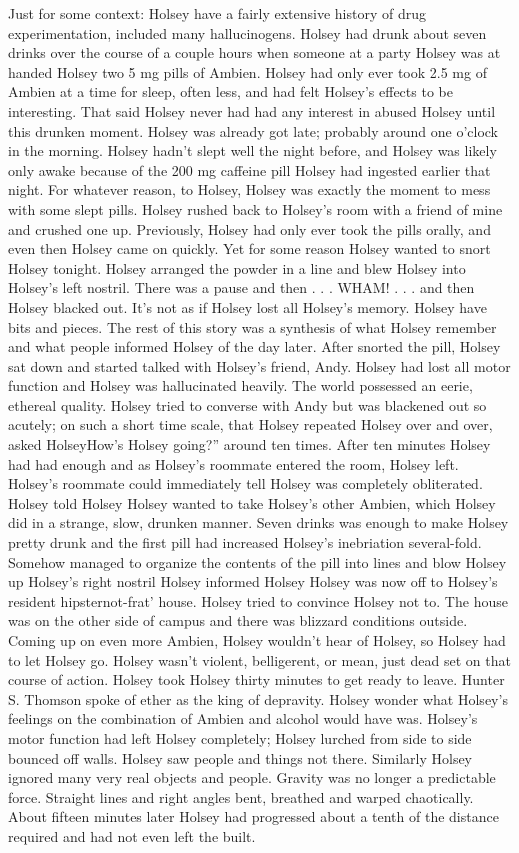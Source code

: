 \documentclass[12pt]{book}
\begin{document}
Just for some context: Holsey have a fairly extensive history of drug experimentation, included many hallucinogens. Holsey had drunk about seven drinks over the course of a couple hours when someone at a party Holsey was at handed Holsey two 5 mg pills of Ambien. Holsey had only ever took 2.5 mg of Ambien at a time for sleep, often less, and had felt Holsey's effects to be interesting. That said Holsey never had had any interest in abused Holsey until this drunken moment. Holsey was already got late; probably around one o'clock in the morning. Holsey hadn't slept well the night before, and Holsey was likely only awake because of the 200 mg caffeine pill Holsey had ingested earlier that night. For whatever reason, to Holsey, Holsey was exactly the moment to mess with some slept pills. Holsey rushed back to Holsey's room with a friend of mine and crushed one up. Previously, Holsey had only ever took the pills orally, and even then Holsey came on quickly. Yet for some reason Holsey wanted to snort Holsey tonight. Holsey arranged the powder in a line and blew Holsey into Holsey's left nostril. There was a pause and then . . .  WHAM!  . . . and then Holsey blacked out. It's not as if Holsey lost all Holsey's memory. Holsey have bits and pieces. The rest of this story was a synthesis of what Holsey remember and what people informed Holsey of the day later. After snorted the pill, Holsey sat down and started talked with Holsey's friend, Andy. Holsey had lost all motor function and Holsey was hallucinated heavily. The world possessed an eerie, ethereal quality. Holsey tried to converse with Andy but was blackened out so acutely; on such a short time scale, that Holsey repeated Holsey over and over, asked HolseyHow's Holsey going?'' around ten times. After ten minutes Holsey had had enough and as Holsey's roommate entered the room, Holsey left. Holsey's roommate could immediately tell Holsey was completely obliterated. Holsey told Holsey Holsey wanted to take Holsey's other Ambien, which Holsey did in a strange, slow, drunken manner. Seven drinks was enough to make Holsey pretty drunk and the first pill had increased Holsey's inebriation several-fold. Somehow managed to organize the contents of the pill into lines and blow Holsey up Holsey's right nostril Holsey informed Holsey Holsey was now off to Holsey's resident hipsternot-frat' house. Holsey tried to convince Holsey not to. The house was on the other side of campus and there was blizzard conditions outside. Coming up on even more Ambien, Holsey wouldn't hear of Holsey, so Holsey had to let Holsey go. Holsey wasn't violent, belligerent, or mean, just dead set on that course of action. Holsey took Holsey thirty minutes to get ready to leave. Hunter S. Thomson spoke of ether as the king of depravity. Holsey wonder what Holsey's feelings on the combination of Ambien and alcohol would have was. Holsey's motor function had left Holsey completely; Holsey lurched from side to side bounced off walls. Holsey saw people and things not there. Similarly Holsey ignored many very real objects and people. Gravity was no longer a predictable force. Straight lines and right angles bent, breathed and warped chaotically. About fifteen minutes later Holsey had progressed about a tenth of the distance required and had not even left the built. 
\end{document}
